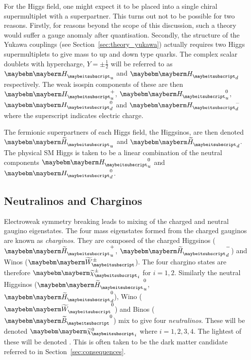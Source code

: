 For the Higgs field, one might expect it to be placed into a single chiral
supermultiplet with a \spinhalf superpartner. This turns out not to be possible
for two reasons. Firstly, for reasons beyond the scope of this discussion, such
a theory would suffer a gauge anomaly after quantisation. Secondly, the
structure of the Yukawa couplings (see Section~\ref{sec:theory_yukawa}) actually
requires two Higgs supermultiplets to give mass to up and down type quarks. The
complex scalar doublets with hypercharge, $Y=\pm\frac{1}{2}$ will be referred to
as $\PHiggs_u$ and $\PHiggs_d$ respectively. The weak isospin components of
these are then $\PHiggs_u^+$, $\PHiggs_u^0$, $\PHiggs_d^0$ and $\PHiggs_d^-$
where the superscript indicates electric charge.

The fermionic superpartners of each Higgs field, the Higgsinos, are then denoted
$\PSHiggs_u$ and $\PSHiggs_d$. The physical \ac{SM} Higgs is taken to be a
linear combination of the neutral components $\PHiggs_u^0$ and $\PHiggs_d^0$.




\subsection{Neutralinos and Charginos}
Electroweak symmetry breaking leads to mixing of the charged and neutral gaugino
eigenstates. The four mass eigenstates formed from the charged gauginos are
known as \emph{charginos}. They are composed of the charged Higgsinos
($\PSHiggs_u^+$, $\PSHiggs_d^-$) and Winos ($\PSWpm$). The four chargino states
are therefore $\PScharginopm_i$ for $i=1,2$. Similarly the neutral Higgsinos
($\PSHiggs_u^0$, $\PSHiggs_d^0$), Wino ($\PSW^0$) and Binos ($\PSB^0$) mix to
give four \emph{neutralinos}. These will be denoted $\PSneutralino_i$ where
$i=1,2,3,4$. The lightest of these will be denoted \PSneutralino. This is often
taken to be the dark matter candidate referred to in
Section~\ref{sec:consequences}.

